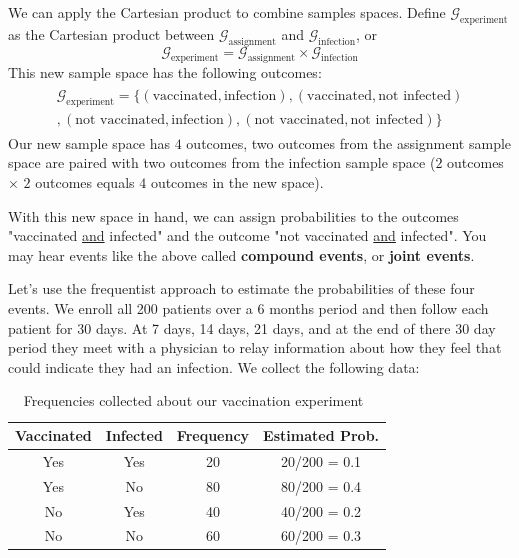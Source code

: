 We can apply the Cartesian product to combine samples spaces.
Define $\mathcal{G}_{\text{experiment}}$ as the Cartesian product between $\mathcal{G}_{\text{assignment}}$ and $\mathcal{G}_{\text{infection}}$, or 
\begin{equation}
    \mathcal{G}_{\text{experiment}} = \mathcal{G}_{\text{assignment}} \times \mathcal{G}_{\text{infection}}
\end{equation}
This new sample space has the following outcomes:
\begin{align}
   \begin{aligned}
   \mathcal{G}_{\text{experiment}} = \{(\text{vaccinated},\text{infection}),(\text{vaccinated},\text{not infected}) \\
   ,(\text{not vaccinated},\text{infection}),(\text{not vaccinated},\text{not infected})\}
   \end{aligned}
\end{align}
Our new sample space has $4$ outcomes, two outcomes from the assignment sample space are paired with two outcomes from the infection sample space ($2$ outcomes $\times$ $2$ outcomes equals $4$ outcomes in the new space).

With this new space in hand, we can assign probabilities to the outcomes "vaccinated \underline{and} infected" and the outcome "not vaccinated \underline{and} infected".
You may hear events like the above called \textbf{compound events}, or \textbf{joint events}.

Let's use the frequentist approach to estimate the probabilities of these four events.
We enroll all 200 patients over a 6 months period and then follow each patient for 30 days. 
At 7 days, 14 days, 21 days, and at the end of there 30 day period they meet with a physician to relay information about how they feel that could indicate they had an infection.
We collect the following data:

\begin{table}[ht!]
    \centering
    \begin{tabular}{cccc}
        \hline
        Vaccinated & Infected & Frequency & Estimated Prob.\\
        \hline
         Yes & Yes &  20 & 20/200 = 0.1 \\
         Yes & No  &  80 & 80/200 = 0.4 \\
         No  & Yes &  40 & 40/200 = 0.2 \\
         No  & No  &  60 & 60/200 = 0.3 \\
         \hline
    \end{tabular}
    \caption{Frequencies collected about our vaccination experiment~\label{tab1.vacc}}
\end{table}

